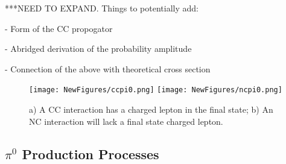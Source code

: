 \documentclass[12pt]{article}
\begin{document}
\par ****NEED TO EXPAND. Things to potentially add:
\par - Form of the CC propogator 
\par - Abridged derivation of the probability amplitude
\par - Connection of the above with theoretical cross section 



\begin{figure}[H]
\centering
\texttt{[image: NewFigures/ccpi0.png]}
\hspace{3 mm}
\texttt{[image: NewFigures/ncpi0.png]}
\caption{a) A CC interaction has a charged lepton in the final state; b) An NC interaction will lack a final state charged lepton.} 
\label{fig:CCNC}
\end{figure}

\subsection{  $\pi^0$ Production Processes }
\end{document}
